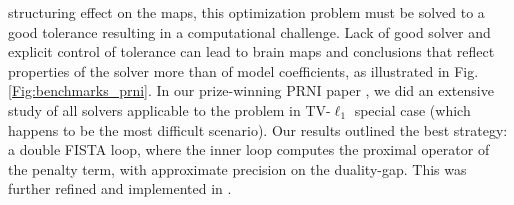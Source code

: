 structuring effect on the maps, this optimization problem must be
solved to a good tolerance resulting in a computational challenge. Lack of good solver and explicit control of
tolerance can lead to brain maps and conclusions that reflect
properties of the solver more than of model coefficients, as illustrated in Fig. \ref{Fig:benchmarks_prni}.
In our prize-winning PRNI paper  \citep{dohmatob2014benchmarking}, we did an extensive study of all solvers applicable to the problem in TV-$\ell_1$ special case (which happens to be the most difficult scenario).
Our results outlined the best strategy: a double FISTA loop, where the
inner loop computes the proximal operator of the penalty term, with approximate precision on the duality-gap. This was
further refined and implemented in  \citep{varoquaux2015faasta}.

  

